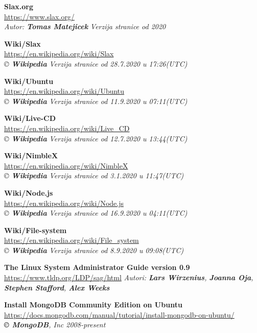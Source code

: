 \documentclass[12pt,vi]{mitthesis}
\begin{document}
\begin{thebibliography}{38}
\textbf{Slax.org}\\
\url{https://www.slax.org/}\\
\textit{Autor: \textbf{Tomas Matejicek}}
\textit{Verzija stranice od 2020}

\textbf{Wiki/Slax}\\
\url{https://en.wikipedia.org/wiki/Slax}\\
\textit{© \textbf{Wikipedia}}
\textit{Verzija stranice od 28.7.2020 u 17:26(UTC)}

\textbf{Wiki/Ubuntu}\\
\url{https://en.wikipedia.org/wiki/Ubuntu}\\
\textit{© \textbf{Wikipedia}}
\textit{Verzija stranice od 11.9.2020 u 07:11(UTC)}

\textbf{Wiki/Live-CD}\\
\url{https://en.wikipedia.org/wiki/Live_CD}\\
\textit{© \textbf{Wikipedia}}
\textit{Verzija stranice od 12.7.2020 u 13:44(UTC)}

\textbf{Wiki/NimbleX}\\
\url{https://en.wikipedia.org/wiki/NimbleX}\\
\textit{© \textbf{Wikipedia}}
\textit{Verzija stranice od 3.1.2020 u 11:47(UTC)}

\textbf{Wiki/Node.js}\\
\url{https://en.wikipedia.org/wiki/Node.js}\\
\textit{© \textbf{Wikipedia}}
\textit{Verzija stranice od 16.9.2020 u 04:11(UTC)}

\textbf{Wiki/File-system}\\
\url{https://en.wikipedia.org/wiki/File_system}\\
\textit{© \textbf{Wikipedia}}
\textit{Verzija stranice od 8.9.2020 u 09:08(UTC)}

\textbf{The Linux System Administrator Guide version 0.9}\\
\url{https://www.tldp.org/LDP/sag/html}
\textit{Autori: \textbf{Lars Wirzenius}, \textbf{Joanna Oja}, \textbf{Stephen Stafford}, \textbf{Alex Weeks}}

\textbf{Install MongoDB Community Edition on Ubuntu}\\
\url{https://docs.mongodb.com/manual/tutorial/install-mongodb-on-ubuntu/}\\
\textit{\textbf{© MongoDB}, Inc 2008-present}


\end{thebibliography}
\end{document}

